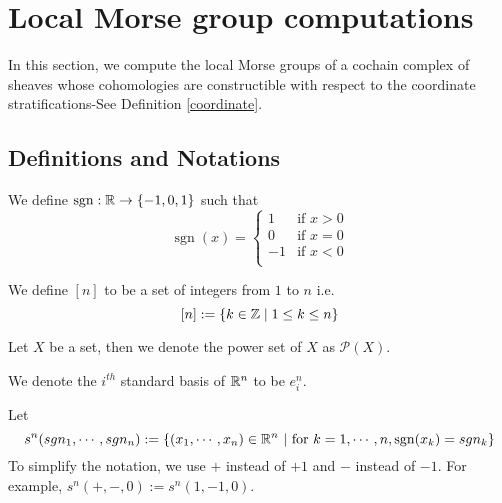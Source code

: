 \section{Local Morse group computations}
In this section, we compute the local Morse groups of a cochain complex of sheaves whose cohomologies are constructible with respect to the coordinate stratifications-See Definition \ref{coordinate}.
\subsection*{Definitions and Notations}
\begin{definition}
We define $\operatorname{sgn} : \mathbb{R} \rightarrow \{-1,0,1\}$ such that
\[
\operatorname{sgn}(x)=
\begin{cases}
    1 & \text{if } x>0\\
    0 & \text{if } x=0\\
    -1 & \text{if } x<0\\
\end{cases}
\]
\end{definition}
\begin{definition}
We define $[n]$ to be a set of integers from $1$ to $n$ i.e.
\[
[n] := \{k \in \mathbb{Z} \mid 1\leq k \leq n\}
\]
\end{definition}
\begin{definition}
Let $X$ be a set, then we denote the power set of $X$ as $\mathcal{P}(X)$.
\end{definition}
\begin{definition}
We denote the $i^{th}$ standard basis of $\mathbb{R}^n$ to be $e^n_i$.
\end{definition}
\begin{definition}
Let
\[
s^n(sgn_1,\cdots,sgn_n):= \{(x_1,\cdots,x_n)\in \mathbb{R}^n ~|~ \text{for }k=1,\cdots,n, \operatorname{sgn}(x_k)=sgn_k\}
\]
To simplify the notation, we use $+$ instead of $+1$ and $-$ instead of $-1$. For example, $s^n(+,-,0):= s^n(1,-1,0)$.
\end{definition}
